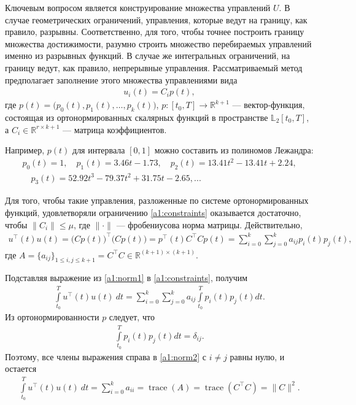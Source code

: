 \documentclass[../main.tex]{subfiles}
\begin{document}
  Ключевым вопросом является конструирование множества управлений $U$.
  В случае геометрических ограничений, управления, которые ведут на границу, как правило, разрывны.
  Соответственно, для того, чтобы точнее построить границу множества достижимости, разумно строить множество перебираемых управлений именно из разрывных функций. 
  В случае же интегральных ограничений, на границу ведут, как правило, непрерывные управления. 
  Рассматриваемый метод предполагает заполнение этого множества управлениями вида 
  \begin{gather}
  	u_i(t) = C_i p (t),
  \end{gather}
  где $p(t) = \big(p_{0}(t),p_{1}(t),\dots,p_{k}(t)\big)$, $p: [t_0, {T}] \rightarrow \mathbb{R}^{k+1} $ --- вектор-функция, состоящая из ортонормированных скалярных функций в пространстве $\mathbb{L}_2[t_0, {T}]$, а $C_i \in \mathbb{R}^{r \times k+1}$ --- матрица коэффициентов. 
	  
  Например, $p(t)$ для интервала $[0,1]$ можно составить из полиномов Лежандра:
  \begin{gather*}
  	p_0(t) = 1, \quad p_1(t) = 3.46t-1.73, \quad p_2(t) = 13.41t^2 - 13.41t + 2.24, \\ \quad 
  	p_3(t) = 52.92t^3 - 79.37t^2+31.75t -2.65, ...
  \end{gather*}
  
  Для того, чтобы такие управления, разложенные по системе ортонормированных функций, удовлетворяли ограничению \eqref{a1:constraints} оказывается достаточно, чтобы $\|C_i\| \leqslant \mu$, где $\|\cdot\| $ --- фробениусова норма матрицы.
  Действительно,
  \begin{gather}\label{a1:norm1}
  	 u^{\top}(t) u(t) = \big(C p(t)\big)^{\top} \big(C p(t)\big) = p^{\top}(t) C^{\top} C p(t) = \sum_{i=0}^k \sum_{j=0}^k a_{ij} p_i(t) p_j(t),
  \end{gather}
  где $ A = \{a_{ij}\}_{1\leqslant i,j \leqslant k + 1} = C^{\top} C \in \mathbb{R}^{(k+1) × (k+1)} $.
  
  Подставляя выражение из \eqref{a1:norm1} в \eqref{a1:constraints}, получим
  \begin{gather}\label{a1:norm2}
  		\int\limits_{t_0}^T u^{\top}(t) u(t) \ dt = \sum_{i=0}^k \sum_{j=0}^k a_{ij} \int\limits_{t_0}^T p_i(t) p_j(t) dt.
  \end{gather}
  Из ортонормированности $p$ следует, что 
  \begin{gather}
  	\int\limits_{t_0}^T p_i(t) p_j(t) dt = \delta_{ij}. 
  \end{gather}
  Поэтому, все члены выражения справа в \eqref{a1:norm2}  с $i \neq j$ равны нулю, и остается 
  \begin{gather}
  	\int\limits_{t_0}^T u^{\top}(t) u(t) \ dt =  \sum_{i=0}^k  a_{ii} = \operatorname{trace}(A) = \operatorname{trace}(C^{\top} C) = \| C\|^2.
  \end{gather}
  
\end{document}
